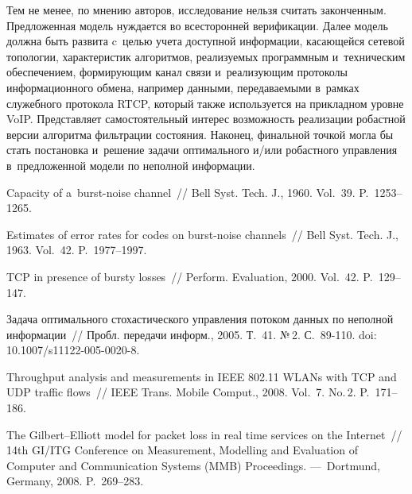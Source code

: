 \begin{multicols}{2}
Тем не менее, по  мнению авторов, исследование нельзя считать
законченным. Предложенная модель нуждается во всесторонней
верификации. Далее модель должна быть развита c~целью учета
доступной информации, касающейся сетевой топологии, характеристик
алгоритмов, реали\-зу\-емых программным и~техническим обеспечением,
формирующим канал связи и~реализующим протоколы информационного
обмена, например данными, передаваемыми в~рамках служебного
протокола RTCP, который также используется на прикладном уровне
VoIP. Представляет самостоятельный интерес возможность реализации
робастной версии алгоритма фильтрации состояния. Наконец, финальной
точкой могла бы стать постановка и~решение задачи оптимального и/или
робастного управления в~предложенной модели по неполной информации.

\vspace*{-6pt}

{\small\frenchspacing
 {%
 \begin{thebibliography}{99}
 
 \vspace*{-2pt}

 Capacity of a~burst-noise channel~// {Bell
Syst. Tech. J., 1960.} Vol.~39. P.~1253--1265.

 Estimates of error rates for codes on
burst-noise channels~// {Bell Syst. Tech. J., 1963.}
Vol.~42. P.~1977--1997.

 TCP in presence of
bursty losses~// {Perform. Evaluation, 2000.} Vol.~42.
P.~129--147.

Задача оптимального стохастического управ\-ле\-ния потоком данных по
неполной информации~//
{Пробл. передачи информ., 2005.} Т.~41. №\,2. С.~89-110. 
doi: 10.1007/s11122-005-0020-8.

 Throughput analysis and
measurements in IEEE 802.11 WLANs with TCP and UDP traffic flows~//
{IEEE Trans. Mobile Comput., 2008.} Vol.~7. No.\,2. P.~171--186.

 The Gilbert--Elliott model for
packet loss in real time services on the Internet~// {14th GI/ITG
Conference on Measurement, Modelling and Evaluation of Computer and
Communication Systems (MMB) Proceedings.} ---~Dortmund, Germany,
2008. P.~269--283.


\end{thebibliography}}}
\end{multicols}

